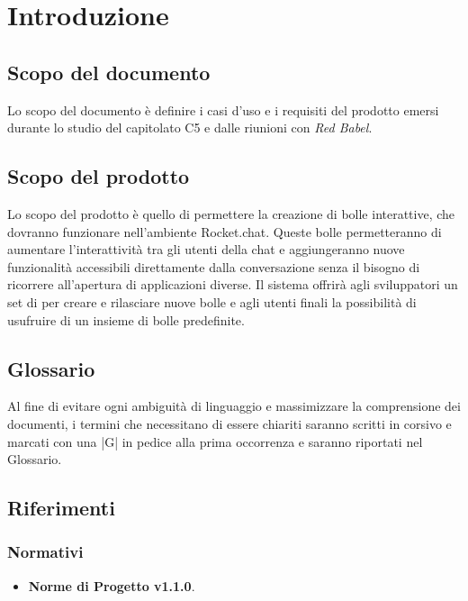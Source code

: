 \section{Introduzione}

\subsection{Scopo del documento}
Lo scopo del documento è definire i casi d'uso e i requisiti del prodotto emersi durante lo studio del capitolato C5 e dalle riunioni con \textit{Red Babel}.

\subsection{Scopo del prodotto}

Lo scopo del prodotto è quello di permettere la creazione di bolle
interattive, che dovranno funzionare nell’ambiente Rocket.chat. Queste
bolle permetteranno di aumentare l'interattività tra gli utenti della
chat e aggiungeranno nuove funzionalità accessibili
direttamente dalla conversazione senza il bisogno di ricorrere
all'apertura di applicazioni diverse.
Il sistema offrirà agli sviluppatori un set di  per creare e
rilasciare nuove bolle e agli utenti finali la possibilità di
usufruire di un insieme di bolle predefinite.

\subsection{Glossario}

Al fine di evitare ogni ambiguità di linguaggio e massimizzare la
comprensione dei documenti, i termini che necessitano di essere
chiariti saranno scritti in corsivo e marcati con una |G| in pedice alla prima
occorrenza e saranno riportati nel Glossario.


\subsection{Riferimenti}

\subsubsection{Normativi}
\begin{itemize}
\item \textbf{Norme di Progetto v1.1.0}.
\end{itemize}

